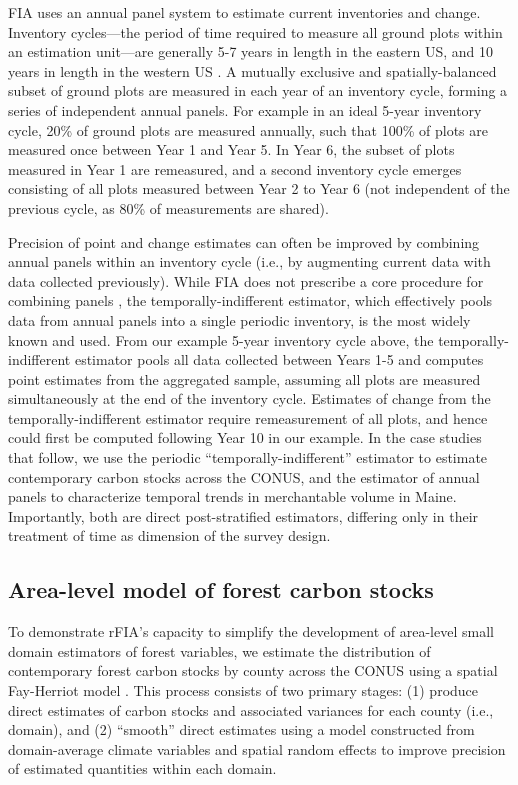 \documentclass[11pt]{article}
\begin{document}
FIA uses an annual panel system to estimate current inventories and change. Inventory cycles---the period of time required to measure all ground plots within an estimation unit---are generally 5-7 years in length in the eastern US, and 10 years in length in the western US \citep{bechtold2005enhanced}. A mutually exclusive and spatially-balanced subset of ground plots are measured in each year of an inventory cycle, forming a series of independent annual panels. For example in an ideal 5-year inventory cycle, 20\% of ground plots are measured annually, such that 100\% of plots are measured once between Year 1 and Year 5. In Year 6, the subset of plots measured in Year 1 are remeasured, and a second inventory cycle emerges consisting of all plots measured between Year 2 to Year 6 (not independent of the previous cycle, as 80\% of measurements are shared).

Precision of point and change estimates can often be improved by combining annual panels within an inventory cycle (i.e., by augmenting current data with data collected previously). While FIA does not prescribe a core procedure for combining panels \citep{bechtold2005enhanced}, the temporally-indifferent estimator, which effectively pools data from annual panels into a single periodic inventory, is the most widely known and used. From our example 5-year inventory cycle above, the temporally-indifferent estimator pools all data collected between Years 1-5 and computes point estimates from the aggregated sample, assuming all plots are measured simultaneously at the end of the inventory cycle. Estimates of change from the temporally-indifferent estimator require remeasurement of all plots, and hence could first be computed following Year 10 in our example. In the case studies that follow, we use the periodic ``temporally-indifferent'' estimator to estimate contemporary carbon stocks across the CONUS, and the estimator of annual panels to characterize temporal trends in merchantable volume in Maine. Importantly, both are direct post-stratified estimators, differing only in their treatment of time as dimension of the survey design. 

\subsection*{Area-level model of forest carbon stocks}
To demonstrate rFIA's capacity to simplify the development of area-level small domain estimators of forest variables, we estimate the distribution of contemporary forest carbon stocks by county across the CONUS using a spatial Fay-Herriot model \citep{fay1979estimates, petrucci2006small}. This process consists of two primary stages: (1) produce direct estimates of carbon stocks and associated variances for each county (i.e., domain), and (2) ``smooth'' direct estimates using a model constructed from domain-average climate variables and spatial random effects to improve precision of estimated quantities within each domain. 
\end{document}
